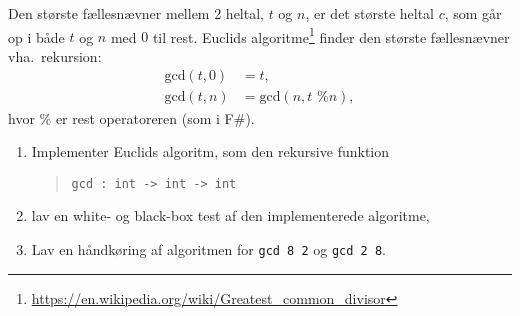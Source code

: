\label{gcd} Den største fællesnævner mellem 2 heltal, $t$ og $n$, er det største heltal $c$, som går op i både $t$ og $n$ med $0$ til rest. Euclids algoritme\footnote{\url{https://en.wikipedia.org/wiki/Greatest_common_divisor}} finder den største fællesnævner vha.\ rekursion:
  \begin{align}
    \text{gcd}(t,0) &= t, \label{gcd:1}
    \\ \text{gcd}(t,n) &= \text{gcd}(n, t \text{ \% } n), \label{gcd:2}
  \end{align}
hvor $\%$ er rest operatoreren (som i F\#). 
\begin{enumerate}
\item Implementer Euclids algoritm, som den rekursive funktion
  \begin{quote}
    \lstinline{gcd : int -> int -> int}
  \end{quote}
\item lav en white- og black-box test af den implementerede algoritme,
\item Lav en håndkøring af algoritmen for \lstinline{gcd 8 2} og \lstinline{gcd 2 8}.
\end{enumerate}
